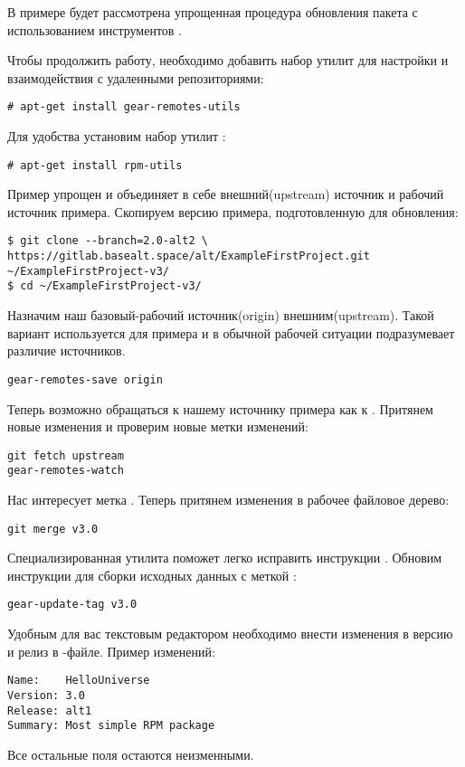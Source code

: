 В примере будет рассмотрена упрощенная процедура обновления пакета с
использованием инструментов .

Чтобы продолжить работу, необходимо добавить набор утилит  для
настройки и взаимодействия с удаленными репозиториями:
\begin{verbatim}
# apt-get install gear-remotes-utils
\end{verbatim}

Для удобства установим набор утилит :
\begin{verbatim}
# apt-get install rpm-utils
\end{verbatim}

Пример упрощен и объединяет в себе внешний(upstream) источник и
рабочий источник примера. Скопируем версию примера, подготовленную для
обновления:
\begin{verbatim}
$ git clone --branch=2.0-alt2 \
https://gitlab.basealt.space/alt/ExampleFirstProject.git ~/ExampleFirstProject-v3/
$ cd ~/ExampleFirstProject-v3/
\end{verbatim}

Назначим наш базовый-рабочий источник(origin) внешним(upstream). Такой вариант
используется для примера и в обычной рабочей ситуации подразумевает различие источников.
\begin{verbatim}
gear-remotes-save origin
\end{verbatim}

Теперь возможно обращаться к нашему источнику примера как к .
Притянем новые изменения и проверим новые метки изменений:
\begin{verbatim}
git fetch upstream
gear-remotes-watch
\end{verbatim}

Нас интересует метка . Теперь притянем изменения в рабочее файловое дерево:
\begin{verbatim}
git merge v3.0
\end{verbatim}

Специализированная утилита поможет легко исправить инструкции
.
Обновим инструкции для сборки исходных данных с меткой :
\begin{verbatim}
gear-update-tag v3.0
\end{verbatim}

Удобным для вас текстовым редактором необходимо внести изменения в версию и релиз
в \Sys{.spec}-файле. Пример изменений:
\begin{verbatim}
Name:    HelloUniverse
Version: 3.0
Release: alt1
Summary: Most simple RPM package
\end{verbatim}
Все остальные поля остаются неизменными.

